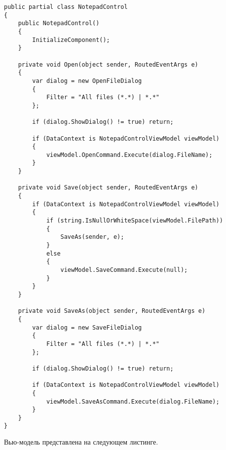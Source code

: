 \documentclass[a4paper,14pt]{extarticle}
\begin{document}
\begin{lstlisting}
public partial class NotepadControl
{
    public NotepadControl()
    {
        InitializeComponent();
    }

    private void Open(object sender, RoutedEventArgs e)
    {
        var dialog = new OpenFileDialog
        {
            Filter = "All files (*.*) | *.*"
        };

        if (dialog.ShowDialog() != true) return;

        if (DataContext is NotepadControlViewModel viewModel)
        {
            viewModel.OpenCommand.Execute(dialog.FileName);
        }
    }

    private void Save(object sender, RoutedEventArgs e)
    {
        if (DataContext is NotepadControlViewModel viewModel)
        {
            if (string.IsNullOrWhiteSpace(viewModel.FilePath))
            {
                SaveAs(sender, e);
            }
            else
            {
                viewModel.SaveCommand.Execute(null);
            }
        }
    }

    private void SaveAs(object sender, RoutedEventArgs e)
    {
        var dialog = new SaveFileDialog
        {
            Filter = "All files (*.*) | *.*"
        };

        if (dialog.ShowDialog() != true) return;

        if (DataContext is NotepadControlViewModel viewModel)
        {
            viewModel.SaveAsCommand.Execute(dialog.FileName);
        }
    }
}
\end{lstlisting}

Вью-модель представлена на следующем листинге.
\end{document}
